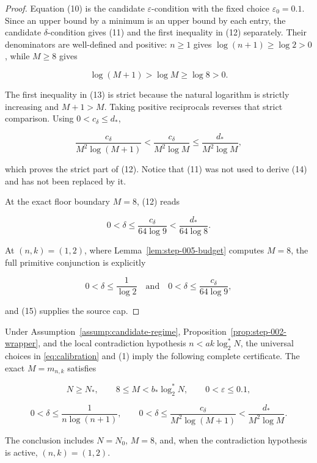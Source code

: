 \begin{proof}
Equation (10) is the candidate \(\varepsilon\)-condition with the fixed
choice \(\varepsilon_0=0.1\). Since an upper bound by a minimum is an upper
bound by each entry, the candidate \(\delta\)-condition gives (11) and the
first inequality in (12) separately. Their denominators are well-defined
and positive: \(n\ge1\) gives \(\log(n+1)\ge\log2>0\), while \(M\ge8\)
gives

\[
\log(M+1)>\log M\ge\log8>0.
\tag{13}
\]

The first inequality in (13) is strict because the natural logarithm is
strictly increasing and \(M+1>M\). Taking positive reciprocals reverses
that strict comparison. Using \(0<c_\delta\le d_*\),

\[
\frac{c_\delta}{M^2\log(M+1)}
<\frac{c_\delta}{M^2\log M}
\le\frac{d_*}{M^2\log M},
\tag{14}
\]

which proves the strict part of (12). Notice that (11) was not used to
derive (14) and has not been replaced by it.

At the exact floor boundary \(M=8\), (12) reads

\[
0<\delta\le\frac{c_\delta}{64\log9}
<\frac{d_*}{64\log8}.
\tag{15}
\]

At \((n,k)=(1,2)\), where Lemma~\ref{lem:step-005-budget} computes
\(M=8\), the full primitive conjunction is explicitly

\[
0<\delta\le\frac1{\log2}
\quad\text{and}\quad
0<\delta\le\frac{c_\delta}{64\log9},
\]

and (15) supplies the source cap. \end{proof}

\begin{proposition}\label{prop:step-005-certificate}
Under Assumption~\ref{assump:candidate-regime}, Proposition~\ref{prop:step-002-wrapper}, and the local contradiction
hypothesis \(n<ak\log_2^*N\), the universal choices in
\eqref{eq:calibration} and (1) imply
the following complete certificate.  The exact \(M=m_{n,k}\) satisfies

\[
N\ge N_*,
\qquad 8\le M<b_*\log_2^*N,
\qquad 0<\varepsilon\le0.1,
\]

\[
0<\delta\le\frac1{n\log(n+1)},
\qquad
0<\delta\le\frac{c_\delta}{M^2\log(M+1)}
<\frac{d_*}{M^2\log M}.
\]

The conclusion includes \(N=N_0\), \(M=8\), and, when the contradiction
hypothesis is active, \((n,k)=(1,2)\).
\end{proposition}

